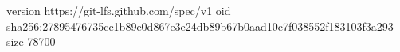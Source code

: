 version https://git-lfs.github.com/spec/v1
oid sha256:27895476735cc1b89e0d867e3e24db89b67b0aad10c7f038552f183103f3a293
size 78700
